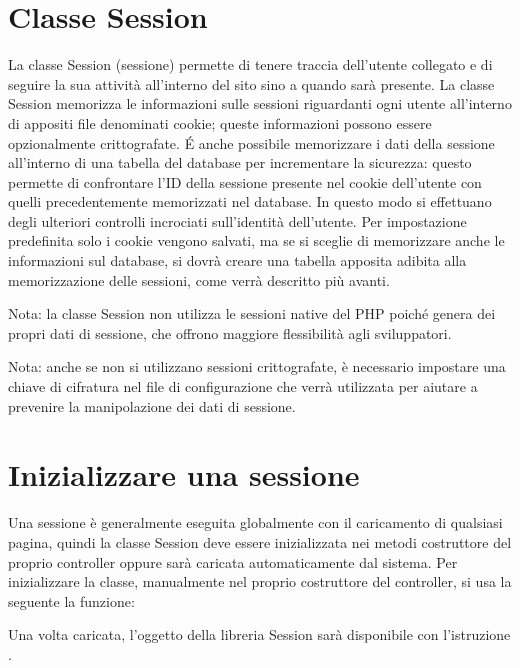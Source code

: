 \section{Classe Session}
\label{class:sessione}

La classe Session (sessione) permette di tenere traccia dell'utente collegato e di seguire la sua attività all'interno del sito sino a quando sarà presente. La classe Session memorizza le informazioni sulle sessioni riguardanti ogni utente all'interno di appositi file denominati cookie; queste informazioni possono essere opzionalmente crittografate. \'E anche possibile memorizzare i dati della sessione all'interno di una tabella del database per incrementare la sicurezza: questo permette di confrontare l'ID della sessione presente nel cookie dell'utente con quelli precedentemente memorizzati nel database. In questo modo si effettuano degli ulteriori controlli incrociati sull'identità dell'utente. Per impostazione predefinita solo i cookie vengono salvati, ma se si sceglie di memorizzare anche le informazioni sul database, si dovrà creare una tabella apposita adibita alla memorizzazione delle sessioni, come verrà descritto più avanti.

Nota: la classe Session non utilizza le sessioni native del \ac{PHP} poiché genera dei propri dati di sessione, che offrono maggiore flessibilità agli sviluppatori.

Nota: anche se non si utilizzano sessioni crittografate, è necessario impostare una chiave di cifratura nel file di configurazione che verrà utilizzata per aiutare a prevenire la manipolazione dei dati di sessione.

\section*{Inizializzare una sessione}
Una sessione è generalmente eseguita globalmente con il caricamento di qualsiasi pagina, quindi la classe Session deve essere inizializzata nei metodi costruttore del proprio controller oppure sarà caricata automaticamente dal sistema. Per inizializzare la classe, manualmente nel proprio costruttore del controller, si usa la seguente la funzione: 


Una volta caricata, l'oggetto della libreria Session sarà disponibile con l'istruzione .

